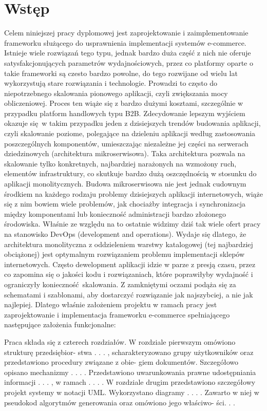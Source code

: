 \chapter{Wstęp}
\thispagestyle{chapterBeginStyle}
Celem niniejszej pracy dyplomowej jest zaprojektowanie i zaimplementowanie frameworku służącego do usprawnienia implementacji systemów e-commerce. Istnieje wiele rozwiązań tego typu, jednak bardzo duża część z nich nie oferuje satysfakcjonujących parametrów wydajnościowych, przez co platformy oparte o takie frameworki są czesto bardzo powolne, do tego rozwijane od wielu lat wykorzystują stare rozwiązania i technologie. Prowadzi to często do niepotrzebnego skalowania pionowego aplikacji, czyli zwiększania mocy obliczeniowej. Proces ten wiąże się z bardzo dużymi kosztami, szczególnie w przypadku platform handlowych typu B2B. Zdecydowanie lepszym wyjściem okazuje się w takim przypadku jeden z dzisiejszych trendów budowania aplikacji, czyli skalowanie poziome, polegające na dzieleniu aplikacji według zastosowania poszczególnych komponentów, umieszczając niezależne jej części na serwerach dziedzinowych (architektura mikroserwisowa). Taka architektura pozwala na skalowanie tylko konkretnych, najbardziej narażonych na wzmożony ruch, elementów infrastruktury, co skutkuje bardzo dużą oszczędnością w stosunku do aplikacji monolitycznych. Budowa mikroserwisowa nie jest jednak cudownym środkiem na każdego rodzaju problemy dzisiejszych aplikacji internetowych, wiąże się z nim bowiem wiele problemów, jak chociażby integracja i synchronizacja między komponentami lub konieczność administracji bardzo złożonego środowiska. Właśnie ze względu na to ostatnie widzimy dziś tak wiele ofert pracy na stanowisko DevOps (development and operations). Wydaje się dlatego, że architektura monolityczna z oddzieleniem warstwy katalogowej (tej najbardziej obciążonej) jest optymalnym rozwiązaniem problemu implementacji sklepów internetowych.
\newline
Często dewelopment aplikacji idzie w parze z presją czasu, przez co zapomina  się o jakości kodu i rozwiązaniach, które poprawiłyby wydajność i ograniczyły konieczność skalowania. Z zamkniętymi oczami podąża się za schematami i szablonami, aby dostarczyć rozwiązanie jak najszybciej, a nie jak najlepiej. Dlatego właśnie założeniem projektu w ramach pracy jest zaprojektowanie i implementacja frameworku e-commerce spełniającego następujące założenia funkcjonalne:

Praca składa się z czterech rozdziałów. W rozdziale pierwszym omówiono strukturę przedsiębior-
stwa . . . , scharakteryzowano grupy użytkowników oraz przedstawiono procedury związane z obie-
giem dokumentów. Szczegółowo opisano mechanizmy . . . . Przedstawiono uwarunkowania prawne
udostępniania informacji . . . , w ramach . . . .
W rozdziale drugim przedstawiono szczegółowy projekt systemy w notacji UML. Wykorzystano
diagramy . . . . Zawarto w niej w pseudokod algorytmów generowania oraz omówiono jego właściwo-
ści. . . 
\newpage
